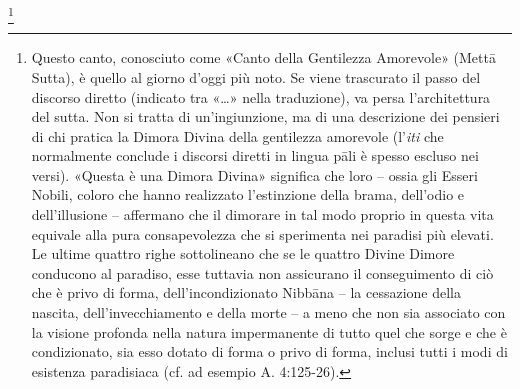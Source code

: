 \footnote{Questo canto, conosciuto come «Canto della Gentilezza
  Amorevole» (Mettā Sutta), è quello al giorno d’oggi più noto. Se viene
  trascurato il passo del discorso diretto (indicato tra «…» nella traduzione),
  va persa l’architettura del sutta. Non si tratta di un’ingiunzione, ma di una
  descrizione dei pensieri di chi pratica la Dimora Divina della gentilezza
  amorevole (l’\emph{iti} che normalmente conclude i discorsi diretti in lingua
  pāli è spesso escluso nei versi). «Questa è una Dimora Divina» significa che
  loro – ossia gli Esseri Nobili, coloro che hanno realizzato l’estinzione della
  brama, dell’odio e dell’illusione – affermano che il dimorare in tal modo
  proprio in questa vita equivale alla pura consapevolezza che si sperimenta nei
  paradisi più elevati. Le ultime quattro righe sottolineano che se le quattro
  Divine Dimore conducono al paradiso, esse tuttavia non assicurano il
  conseguimento di ciò che è privo di forma, dell’incondizionato Nibbāna – la
  cessazione della nascita, dell’invecchiamento e della morte – a meno che non
  sia associato con la visione profonda nella natura impermanente di tutto quel
  che sorge e che è condizionato, sia esso dotato di forma o privo di forma,
  inclusi tutti i modi di esistenza paradisiaca (cf. ad esempio A. 4:125-26).}

